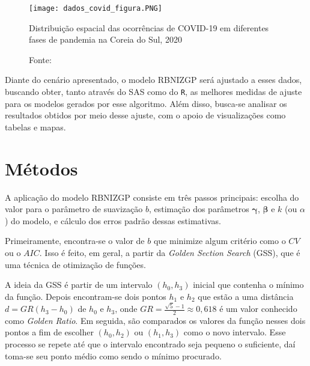 \documentclass[12pt, a4paper, twoside]{report}
\numberwithin{equation}{section} %
\begin{document}
\begin{figure}[H]
    \centering
    \texttt{[image: dados\_covid\_figura.PNG]}
\caption{Distribuição espacial das ocorrências de COVID-19 em diferentes fases de pandemia na Coreia do Sul, 2020}
\caption*{\footnotesize Fonte: \cite{dasilva2023}}
\label{fig:fig1}
\end{figure}

Diante do cenário apresentado, o modelo RBNIZGP será ajustado a esses dados, buscando obter, tanto através do SAS como do \texttt{R}, as melhores medidas de ajuste para os modelos gerados por esse algoritmo. Além disso, busca-se analisar os resultados obtidos por meio desse ajuste, com o apoio de visualizações como tabelas e mapas.





\section{Métodos}\label{secao_4_2}

A aplicação do modelo RBNIZGP consiste em três passos principais: escolha do valor para o parâmetro de suavização $b$, estimação dos parâmetros $\boldsymbol{\gamma}$, $\boldsymbol{\beta}$ e $k$ (ou $\alpha$) do modelo, e cálculo dos erros padrão dessas estimativas.

Primeiramente, encontra-se o valor de $b$ que minimize algum critério como o $CV$ ou o $AIC$. Isso é feito, em geral, a partir da \textit{Golden Section Search} (GSS), que é uma técnica de otimização de funções.

A ideia da GSS é partir de um intervalo $(h_0, h_3)$ inicial que contenha o mínimo da função. Depois encontram-se dois pontos $h_1$ e $h_2$ que estão a uma distância $d=GR(h_3-h_0)$ de $h_0$ e $h_3$, onde $GR=\frac{\sqrt{5}-1}{2} 
\approx 0,618$ é um valor conhecido como \textit{Golden Ratio}. Em seguida, são comparados os valores da função nesses dois pontos a fim de escolher $(h_0,h_2)$ ou $(h_1, h_3)$ como o novo intervalo. Esse processo se repete até que o intervalo encontrado seja pequeno o suficiente, daí toma-se seu ponto médio como sendo o mínimo procurado.
\end{document}
